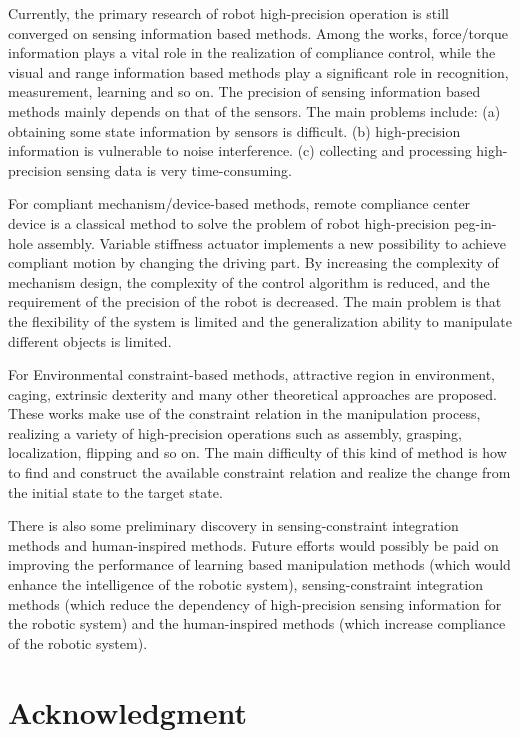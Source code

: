 \documentclass[journal,twoside,web]{ieeecolor}
\begin{document}
Currently, the primary research of robot high-precision operation is still converged on sensing information based methods. 
Among the works, force/torque information plays a vital role in the realization of compliance control, while the visual and range information based methods play a significant role in recognition, measurement, learning and so on. 
The precision of sensing information based methods mainly depends on that of the sensors. 
The main problems include: 
(a) obtaining some state information by sensors is difficult. 
(b) high-precision information is vulnerable to noise interference. 
(c) collecting and processing high-precision sensing data is very time-consuming.

For compliant mechanism/device-based methods, 
remote compliance center device is a classical method to solve the problem of robot high-precision peg-in-hole assembly. 
Variable stiffness actuator implements a new possibility to achieve compliant motion by changing the driving part.
By increasing the complexity of mechanism design, the complexity of the control algorithm is reduced, and the requirement of the precision of the robot is decreased. 
The main problem is that the flexibility of the system is limited and the generalization ability to manipulate different objects is limited.

For Environmental constraint-based methods, attractive region in environment, caging, extrinsic dexterity and many other theoretical approaches are proposed.
These works make use of the constraint relation in the manipulation process, realizing a variety of high-precision operations such as assembly, grasping, localization, flipping and so on. 
The main difficulty of this kind of method is how to find and construct the available constraint relation and realize the change from the initial state to the target state.

There is also some preliminary discovery in sensing-constraint integration methods and human-inspired methods.
Future efforts would possibly be paid on improving the performance of learning based manipulation methods (which would enhance the intelligence of the robotic system), sensing-constraint integration methods (which reduce the dependency of high-precision sensing information for the robotic system) and the human-inspired methods (which increase compliance of the robotic system).

\appendices

\section*{Acknowledgment}
\end{document}
